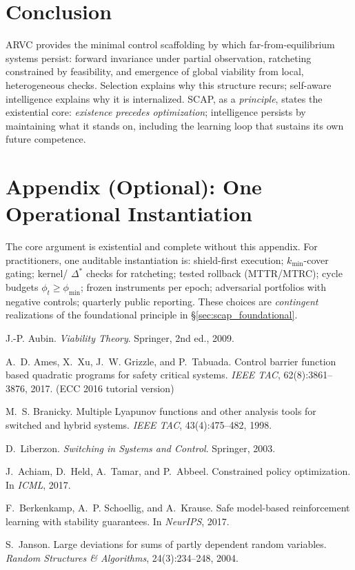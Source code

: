 \documentclass[11pt]{article}
\theoremstyle{definition}
\begin{document}
\section{Conclusion}
ARVC provides the minimal control scaffolding by which far-from-equilibrium systems persist: forward invariance under partial observation, ratcheting constrained by feasibility, and emergence of global viability from local, heterogeneous checks. Selection explains why this structure recurs; self-aware intelligence explains why it is internalized. SCAP, as a \emph{principle}, states the existential core: \emph{existence precedes optimization}; intelligence persists by maintaining what it stands on, including the learning loop that sustains its own future competence.

\appendix
\section*{Appendix (Optional): One Operational Instantiation}
\label{sec:scap_operational}
The core argument is existential and complete without this appendix. For practitioners, one auditable instantiation is: shield-first execution; $k_{\min}$-cover gating; kernel/ $\Delta^\ast$ checks for ratcheting; tested rollback (MTTR/MTRC); cycle budgets $\phi_t\ge \phi_{\min}$; frozen instruments per epoch; adversarial portfolios with negative controls; quarterly public reporting. These choices are \emph{contingent} realizations of the foundational principle in \S\ref{sec:scap_foundational}.

\begin{thebibliography}{9}

J.-P. Aubin.
\newblock \emph{Viability Theory}.
\newblock Springer, 2nd ed., 2009.

A.~D. Ames, X.~Xu, J.~W. Grizzle, and P.~Tabuada.
\newblock Control barrier function based quadratic programs for safety critical systems.
\newblock \emph{IEEE TAC}, 62(8):3861--3876, 2017. (ECC 2016 tutorial version)

M.~S. Branicky.
\newblock Multiple Lyapunov functions and other analysis tools for switched and hybrid systems.
\newblock \emph{IEEE TAC}, 43(4):475--482, 1998.

D.~Liberzon.
\newblock \emph{Switching in Systems and Control}.
\newblock Springer, 2003.

J.~Achiam, D.~Held, A.~Tamar, and P.~Abbeel.
\newblock Constrained policy optimization.
\newblock In \emph{ICML}, 2017.

F.~Berkenkamp, A.~P. Schoellig, and A.~Krause.
\newblock Safe model-based reinforcement learning with stability guarantees.
\newblock In \emph{NeurIPS}, 2017.

S.~Janson.
\newblock Large deviations for sums of partly dependent random variables.
\newblock \emph{Random Structures \& Algorithms}, 24(3):234--248, 2004.

\end{thebibliography}
\end{document}
